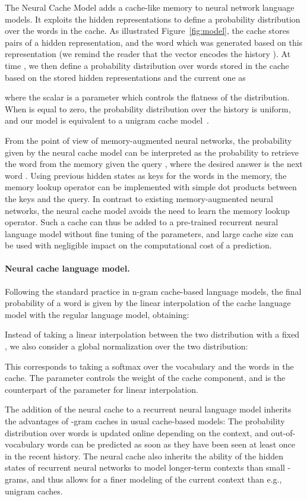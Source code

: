 \documentclass{article} \usepackage{iclr2017_conference,times}
\begin{document}
The Neural Cache Model adds a cache-like memory to neural network
language models.
It exploits the hidden representations  to define a probability distribution over the words in the cache.
As illustrated Figure~\ref{fig:model}, the cache stores pairs  of a hidden
representation, and the word which was generated based on this representation
(we remind the reader that the vector  encodes the history ).
At time , we then define a probability distribution over words stored in the cache based on the
stored hidden representations and the current one  as

where the scalar  is a parameter which controls the flatness of the distribution.
 When  is equal to zero, the probability distribution over the history
 is uniform, and our model is equivalent to a unigram cache
 model~\citep{kuhn1990cache}.

From the point of view of memory-augmented neural networks, the
probability  given by the
neural cache model can be interpreted as the probability to retrieve
the word  from the memory given the query , where the desired
answer is the next word . Using previous hidden states as
keys for the words in the memory, the memory lookup operator can be
implemented with simple dot products between the keys and the
query. In contrast to existing memory-augmented neural networks, the
neural cache model avoids the need to learn the memory lookup
operator. Such a cache can thus be added to a pre-trained recurrent
neural language model without fine tuning of the parameters, and large
cache size can be used with negligible impact on the computational
cost of a prediction.

\paragraph{Neural cache language model.}
Following the standard practice in n-gram cache-based language models,
the final probability of a word is given by  the linear interpolation of
the cache language model with the regular language model, obtaining:


Instead of taking a linear interpolation between the two distribution
with a fixed , we also consider a global normalization over
the two distribution:

This corresponds to taking a softmax over the vocabulary and the words in the cache.
The parameter  controls the weight of the cache component, and is the counterpart of the  parameter for linear interpolation.

The addition of the neural cache to a recurrent neural language model
inherits the advantages of -gram caches in usual cache-based
models: The probability distribution over words is updated online
depending on the context, and out-of-vocabulary words can be predicted
as soon as they have been seen at least once in the recent
history. The neural cache also inherits the ability of the hidden
states of recurrent neural networks to model longer-term contexts than
small -grams, and thus allows for a finer modeling of the
current context than e.g., unigram caches.
\end{document}
